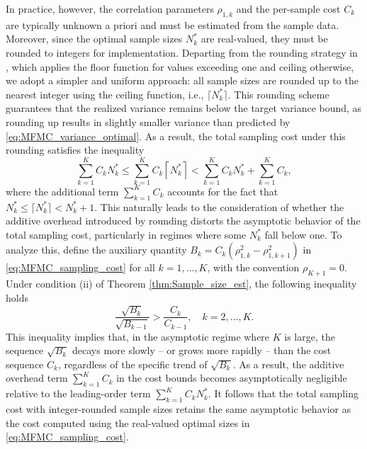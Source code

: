 In practice, however, the correlation parameters $\rho_{1,k}$ and the per-sample cost $C_k$ are typically unknown a priori and must be estimated from the sample data. Moreover, since the optimal sample sizes $N_k^*$ are real-valued, they must be rounded to integers for implementation. Departing from the rounding strategy in \cite{GrGuJuWa:2023, PeWiGu:2016}, which applies the floor function for values exceeding one and ceiling otherwise, we adopt a simpler and uniform approach: all sample sizes are rounded up to the nearest integer using the ceiling function, i.e., $\lceil N_k^* \rceil$. This rounding scheme guarantees that the realized variance remains below the target variance bound, as rounding up results in slightly smaller variance than predicted by \eqref{eq:MFMC_variance_optimal}. As a result, the total sampling cost under this rounding satisfies the inequality
%
\begin{equation}\label{eq:sampling_cost_bound}
    \sum_{k=1}^K C_k N_k^*\le \sum_{k=1}^K C_k \left\lceil N_k^*\right\rceil<\sum_{k=1}^K C_k N_k^* + \sum_{k=1}^K C_k,
\end{equation}
%
where the additional term $\sum_{k=1}^K C_k$ accounts for the fact that $N_k^*\le \lceil N_k^*\rceil< N_k^*+1$. This naturally leads to the consideration of whether the additive overhead introduced by rounding distorts the asymptotic behavior of the total sampling cost, particularly in regimes where some $N_k^*$ fall below one. To analyze this, define the auxiliary quantity $B_k = C_k(\rho_{1,k}^2 - \rho_{1,k+1}^2)$ in \eqref{eq:MFMC_sampling_cost} for all $k=1,\dots, K$, with the convention $\rho_{K+1}=0$. 
%
Under condition (ii) of Theorem \ref{thm:Sample_size_est}, the following inequality holds
%
\begin{equation}
\label{eq:Bk_Ck_decay_rate}
    \frac{\sqrt{B_{k}}}{\sqrt{B_{k-1}}}>\frac{C_{k}}{C_{k-1}}, \quad k=2,\ldots,K.
\end{equation}
%
This inequality implies that, in the asymptotic regime where $K$ is large,  the sequence $\sqrt{B_k}$ decays more slowly -- or grows more rapidly -- than the cost sequence $C_k$, regardless of the specific trend of $\sqrt{B_k}$. As a result, the additive overhead term
$\sum_{k=1}^K C_k$ in the cost bounds becomes asymptotically negligible relative to the leading-order term $\sum_{k=1}^K C_kN_k^*$. It follows that the total sampling cost with integer-rounded sample sizes retains the same asymptotic behavior as the cost computed using the real-valued optimal sizes in \eqref{eq:MFMC_sampling_cost}.


